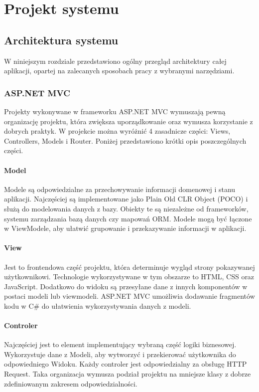 \documentclass{article}
\begin{document}
\newpage

\section{Projekt systemu}

\subsection{Architektura systemu} \label{Architektura systemu}

W niniejszym rozdziale przedstawiono ogólny przegląd architektury całej aplikacji, opartej na zalecanych sposobach pracy z wybranymi narzędziami.

\subsubsection{ASP.NET MVC}

Projekty wykonywane w frameworku ASP.NET MVC wymuszają pewną organizację projektu, która zwiększa uporządkowanie oraz wymusza korzystanie z dobrych praktyk. W projekcie można wyróżnić 4 zasadnicze części: Views, Controllers, Models i Router. Poniżej przedstawiono krótki opis poszczególnych części.

\paragraph{Model}
Modele są odpowiedzialne za przechowywanie informacji domenowej i stanu aplikacji. Najczęściej są implementowane jako Plain Old CLR Object (POCO) i służą do modelowania danych z bazy. Obiekty te są niezależne od frameworków, systemu zarządzania bazą danych czy mapowań ORM. Modele mogą być łączone w ViewModele, aby ułatwić grupowanie i przekazywanie informacji w aplikacji.

\paragraph{View}
Jest to frontendowa część projektu, która determinuje wygląd strony pokazywanej użytkownikowi. Technologie wykorzystywane w tym obszarze to HTML, CSS oraz JavaScript. Dodatkowo do widoku są przesyłane dane z innych komponentów w postaci modeli lub viewmodeli. ASP.NET MVC umożliwia dodawanie fragmentów kodu w C\# do ułatwienia wykorzystywania danych z modeli.

\paragraph{Controler}
Najczęściej jest to element implementujący wybraną część logiki biznesowej. Wykorzystuje dane z Modeli, aby wytworzyć i przekierować użytkownika do odpowiedniego Widoku. Każdy controler jest odpowiedzialny za obsługę HTTP Request. Taka organizacja wymusza podział projektu na mniejsze klasy z dobrze zdefiniowanym zakresem odpowiedzialności.
\end{document}
